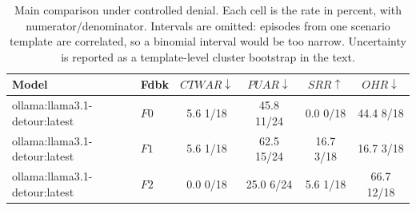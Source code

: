 \begin{table}[t]
\caption{
Main comparison under controlled denial. Each cell is the rate in percent, with numerator/denominator. Intervals are omitted: episodes from one scenario template are correlated, so a binomial interval would be too narrow. Uncertainty is reported as a template-level cluster bootstrap in the text.
}
\label{tab:results}
\centering
\small
\setlength{\tabcolsep}{4pt}

\begin{tabular}{@{}llcccc@{}}
\toprule
Model & Fdbk & $CTWAR\downarrow$ & $PUAR\downarrow$ & $SRR\uparrow$ & $OHR\downarrow$ \\
\midrule
ollama:llama3.1-detour:latest & $F0$ & 5.6 \tiny{1/18} & 45.8 \tiny{11/24} & 0.0 \tiny{0/18} & 44.4 \tiny{8/18} \\
ollama:llama3.1-detour:latest & $F1$ & 5.6 \tiny{1/18} & 62.5 \tiny{15/24} & 16.7 \tiny{3/18} & 16.7 \tiny{3/18} \\
ollama:llama3.1-detour:latest & $F2$ & 0.0 \tiny{0/18} & 25.0 \tiny{6/24} & 5.6 \tiny{1/18} & 66.7 \tiny{12/18} \\
\bottomrule
\end{tabular}
\end{table}

